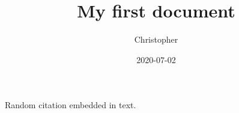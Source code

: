\documentclass{article}
\title{My first document}
\date{2020-07-02}
\author{Christopher}
\begin{document}
	
	Random citation \cite{DUMMY:1} embedded in text.
	
	\newpage
	
	
	
\end{document}

